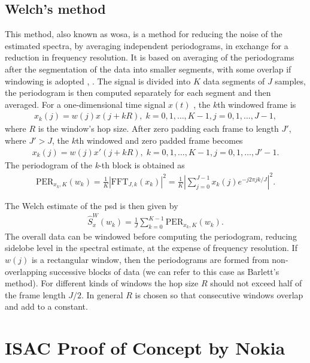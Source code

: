 	
	\subsection{Welch's method}
	
	This method, also known as \gls{wosa}, is a method for reducing the noise of the estimated spectra, by averaging independent periodograms, in exchange for a reduction in frequency resolution.
	It is based on averaging of the periodograms after the segmentation of the data into smaller segments, with some overlap if windowing is adopted \cite{Welch_period}, \cite{Spagnolini_ch14}.
	The signal is divided into $K$ data segments of $J$ samples, the periodogram is then computed separately for each segment and then averaged.
	For a one-dimensional time signal $x(t)$ \cite{SASPWEB2011}, the $k$th windowed frame is
	\begin{align}
		x_k(j) = w(j)x(j + kR), \; k=0,1,\ldots, K-1, j=0,1,\ldots, J-1,
	\end{align}
	where $R$ is the window's hop size.
	After zero padding each frame to length $J'$, where $J' > J$, the $k$th windowed and zero padded frame becomes
		\begin{align}
		x_k(j) = w(j)x'(j + kR), \; k=0,1,\ldots, K-1, j=0,1,\ldots, J'-1.
	\end{align}
	The periodogram of the \textit{k}-th block is obtained as
	\begin{align}
		\text{PER}_{x_k,K}(w_k) = \frac{1}{K} |\text{FFT}_{J,k}(x_k)|^2 = \frac{1}{K}\left|\sum_{j=0}^{J-1}x_k(j)e^{-j2\pi jk/J}\right|^2.
	\end{align}
	
	The Welch estimate of the \gls{psd} is then given by
	\begin{align}
		\hat{S}^W_x(w_k) = \frac{1}{J}\sum_{k=0}^{K-1}\text{PER}_{x_k,K}(w_k).
	\end{align}
	The overall data can be windowed before computing the periodogram, reducing sidelobe level in the spectral estimate, at the expense of frequency resolution. If $w(j)$ is a rectangular window, then the periodograms are formed from non-overlapping successive blocks of data (we can refer to this case as Barlett's method). For different kinds of windows the hop size $R$ should not exceed half of the frame length $J/2$. In general $R$ is chosen so that consecutive windows overlap and add to a constant.

\section{ISAC Proof of Concept by Nokia}
\label{sec:intro-PoCarchitecture}

